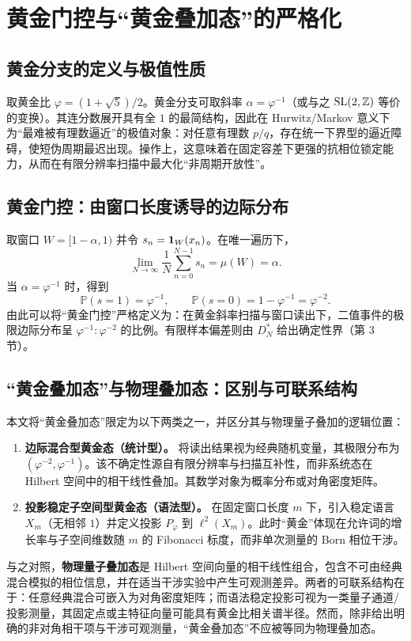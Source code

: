 \section{黄金门控与“黄金叠加态”的严格化}

\subsection{黄金分支的定义与极值性质}

取黄金比 $\varphi=(1+\sqrt5)/2$。黄金分支可取斜率 $\alpha=\varphi^{-1}$（或与之 $\mathrm{SL}(2,\mathbb{Z})$ 等价的变换）。其连分数展开具有全 $1$ 的最简结构，因此在 Hurwitz/Markov 意义下为“最难被有理数逼近”的极值对象：对任意有理数 $p/q$，存在统一下界型的逼近障碍，使短伪周期最迟出现。操作上，这意味着在固定容差下更强的抗相位锁定能力，从而在有限分辨率扫描中最大化“非周期开放性”。

\subsection{黄金门控：由窗口长度诱导的边际分布}

取窗口 $W=[1-\alpha,1)$ 并令 $s_n=\mathbf{1}_W(x_n)$。在唯一遍历下，
\[
\lim_{N\to\infty}\frac1N\sum_{n=0}^{N-1}s_n=\mu(W)=\alpha.
\]
当 $\alpha=\varphi^{-1}$ 时，得到
\[
\mathbb{P}(s=1)=\varphi^{-1},\qquad \mathbb{P}(s=0)=1-\varphi^{-1}=\varphi^{-2}.
\]
由此可以将“黄金门控”严格定义为：在黄金斜率扫描与窗口读出下，二值事件的极限边际分布呈 $\varphi^{-1}:\varphi^{-2}$ 的比例。有限样本偏差则由 $D_N^*$ 给出确定性界（第 3 节）。

\subsection{“黄金叠加态”与物理叠加态：区别与可联系结构}

本文将“黄金叠加态”限定为以下两类之一，并区分其与物理量子叠加的逻辑位置：
\begin{enumerate}
  \item \textbf{边际混合型黄金态（统计型）。}
  将读出结果视为经典随机变量，其极限分布为 $(\varphi^{-2},\varphi^{-1})$。该不确定性源自有限分辨率与扫描互补性，而非系统态在 Hilbert 空间中的相干线性叠加。其数学对象为概率分布或对角密度矩阵。
  \item \textbf{投影稳定子空间型黄金态（语法型）。}
  在固定窗口长度 $m$ 下，引入稳定语言 $X_m$（无相邻 $1$）并定义投影 $P_\varphi$ 到 $\ell^2(X_m)$。此时“黄金”体现在允许词的增长率与子空间维数随 $m$ 的 Fibonacci 标度，而非单次测量的 Born 相位干涉。
\end{enumerate}

与之对照，\textbf{物理量子叠加态}是 Hilbert 空间向量的相干线性组合，包含不可由经典混合模拟的相位信息，并在适当干涉实验中产生可观测差异。两者的可联系结构在于：任意经典混合可嵌入为对角密度矩阵；而语法稳定投影可视为一类量子通道/投影测量，其固定点或主特征向量可能具有黄金比相关谱半径。然而，除非给出明确的非对角相干项与干涉可观测量，“黄金叠加态”不应被等同为物理叠加态。

